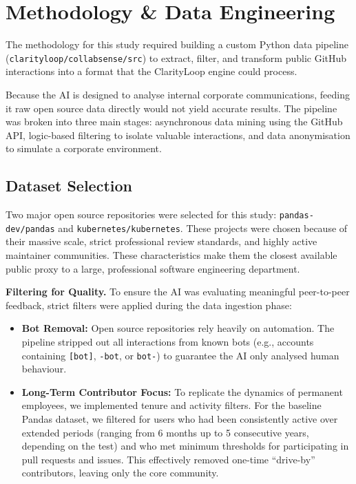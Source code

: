 \documentclass[conference]{IEEEconf}
\begin{document}
\section{Methodology \& Data Engineering}
The methodology for this study required building a custom Python data pipeline (\texttt{clarityloop/collabsense/src}) to extract, filter, and transform public GitHub interactions into a format that the ClarityLoop engine could process.

Because the AI is designed to analyse internal corporate communications, feeding it raw open source data directly would not yield accurate results. The pipeline was broken into three main stages: asynchronous data mining using the GitHub API, logic-based filtering to isolate valuable interactions, and data anonymisation to simulate a corporate environment.

\subsection{Dataset Selection}
Two major open source repositories were selected for this study: \texttt{pandas-dev/pandas} and \texttt{kubernetes/kubernetes}. These projects were chosen because of their massive scale, strict professional review standards, and highly active maintainer communities. These characteristics make them the closest available public proxy to a large, professional software engineering department.

\textbf{Filtering for Quality.}
To ensure the AI was evaluating meaningful peer-to-peer feedback, strict filters were applied during the data ingestion phase:
\begin{itemize}
	\item \textbf{Bot Removal:} Open source repositories rely heavily on automation. The pipeline stripped out all interactions from known bots (e.g., accounts containing \texttt{[bot]}, \texttt{-bot}, or \texttt{bot-}) to guarantee the AI only analysed human behaviour.
	\item \textbf{Long-Term Contributor Focus:} To replicate the dynamics of permanent employees, we implemented tenure and activity filters. For the baseline Pandas dataset, we filtered for users who had been consistently active over extended periods (ranging from 6 months up to 5 consecutive years, depending on the test) and who met minimum thresholds for participating in pull requests and issues. This effectively removed one-time ``drive-by'' contributors, leaving only the core community.
\end{itemize}
\end{document}
